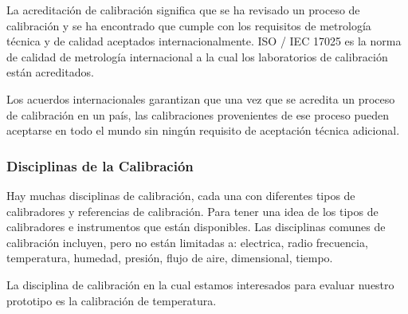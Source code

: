 \par \noindent
La acreditación de calibración significa que se ha revisado un proceso de calibración y se ha encontrado que cumple con los requisitos de metrología técnica y de calidad aceptados internacionalmente. ISO / IEC 17025 es la norma de calidad de metrología internacional a la cual los laboratorios de calibración están acreditados.

\par \noindent
Los acuerdos internacionales garantizan que una vez que se acredita un proceso de calibración en un país, las calibraciones provenientes de ese proceso pueden aceptarse en todo el mundo sin ningún requisito de aceptación técnica adicional.

\subsubsection{Disciplinas de la Calibración \cite{calibracion-fluke}}

\par 
Hay muchas disciplinas de calibración, cada una con diferentes tipos de calibradores y referencias de calibración. Para tener una idea de los tipos de calibradores e instrumentos que están disponibles. Las disciplinas comunes de calibración incluyen, pero no están limitadas a: electrica, radio frecuencia, temperatura, humedad, presión, flujo de aire, dimensional, tiempo.

\par \noindent
La disciplina de calibración en la cual estamos interesados para evaluar nuestro prototipo es la calibración de temperatura.


